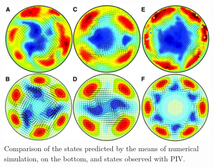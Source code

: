 \documentclass[11pt,a4paper]{article}
\begin{document}
\begin{figure}[h!]
    \centering
    \includegraphics[width=0.95\textwidth]{experiment_vs_simulation.jpg}
    \caption{Comparison of the states predicted by the means of numerical simulation, on the bottom, and states observed with PIV\cite{Hof04etal}.}\label{img:ex_simu}
\end{figure}



\end{document}

